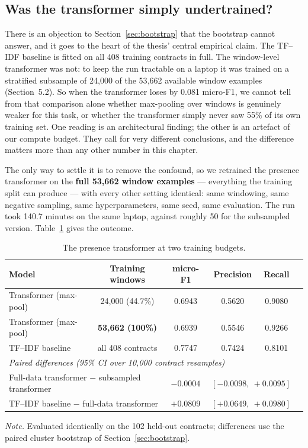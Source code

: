 \subsection{Was the transformer simply undertrained?}
\label{sec:budget}
There is an objection to Section~\ref{sec:bootstrap} that the bootstrap cannot answer, and it goes to the heart of the thesis' central empirical claim. The TF--IDF baseline is fitted on all 408 training contracts in full. The window-level transformer was not: to keep the run tractable on a laptop it was trained on a stratified subsample of 24{,}000 of the 53{,}662 available window examples (Section~5.2). So when the transformer loses by 0.081 micro-F1, we cannot tell from that comparison alone whether max-pooling over windows is genuinely weaker for this task, or whether the transformer simply never saw 55\% of its own training set. One reading is an architectural finding; the other is an artefact of our compute budget. They call for very different conclusions, and the difference matters more than any other number in this chapter.

The only way to settle it is to remove the confound, so we retrained the presence transformer on the \textbf{full 53{,}662 window examples} --- everything the training split can produce --- with every other setting identical: same windowing, same negative sampling, same hyperparameters, same seed, same evaluation. The run took 140.7 minutes on the same laptop, against roughly 50 for the subsampled version. Table~\ref{tab:budget} gives the outcome.

\begin{table}[ht]
\centering
\caption{The presence transformer at two training budgets.}
\label{tab:budget}
\small
\begin{tabular}{lccccc}
\toprule
\textbf{Model} & \textbf{Training windows} & \textbf{micro-F1} & \textbf{Precision} & \textbf{Recall}\\
\midrule
Transformer (max-pool)  & 24{,}000 (44.7\%) & 0.6943 & 0.5620 & 0.9080\\
Transformer (max-pool)  & \textbf{53{,}662 (100\%)} & 0.6939 & 0.5546 & 0.9266\\
TF--IDF baseline        & all 408 contracts & 0.7747 & 0.7424 & 0.8101\\
\midrule
\multicolumn{5}{l}{\emph{Paired differences (95\% CI over 10{,}000 contract resamples)}}\\
\multicolumn{2}{l}{Full-data transformer $-$ subsampled transformer} & $-0.0004$ & \multicolumn{2}{l}{$[-0.0098,\ +0.0095]$}\\
\multicolumn{2}{l}{TF--IDF baseline $-$ full-data transformer} & $+0.0809$ & \multicolumn{2}{l}{$[+0.0649,\ +0.0980]$}\\
\bottomrule
\end{tabular}

{\footnotesize\singlespacing \emph{Note.} Evaluated identically on the 102 held-out contracts; differences use the paired cluster bootstrap of Section~\ref{sec:bootstrap}.\par}
\end{table}

